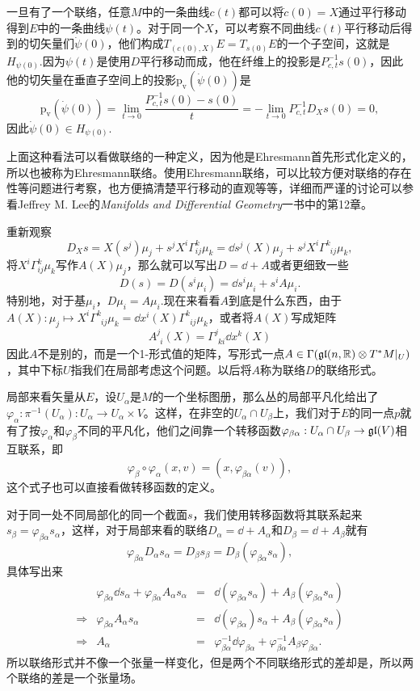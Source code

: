 一旦有了一个联络，任意$M$中的一条曲线$c(t)$都可以将$\dot{c}(0)=X$通过平行移动得到$E$中的一条曲线$\psi(t)$。对于同一个$X$，可以考察不同曲线$c(t)$平行移动后得到的切矢量们$\dot{\psi}(0)$，他们构成$T_{(c(0),X)}E=T_{s(0)}E$的一个子空间，这就是$H_{\psi(0)}$.因为$\psi(t)$是使用$D$平行移动而成，他在纤维上的投影是$P_{c,t}^{-1}s(0)$，因此他的切矢量在垂直子空间上的投影$\mathrm{p_v}(\dot{\psi}(0))$是
\[
	\mathrm{p_v}(\dot{\psi}(0))=\lim_{t\to 0}\frac{P_{c,t}^{-1}s(0)-s(0)}{t}
	=-\lim_{t\to 0}P_{c,t}^{-1}D_{X}s(0)=0,
\]
因此$\dot{\psi}(0)\in H_{\psi(0)}$.

上面这种看法可以看做联络的一种定义，因为他是Ehresmann首先形式化定义的，所以也被称为Ehresmann联络。使用Ehresmann联络，可以比较方便对联络的存在性等问题进行考察，也方便搞清楚平行移动的直观等等，详细而严谨的讨论可以参看Jeffrey M. Lee的\emph{Manifolds and Differential Geometry}一书中的第12章。

重新观察
\[
	D_Xs=X(s^j)\mu_j+s^jX^i\Gamma^{k}_{ij}\mu_k=\dd s^j(X)\mu_j+s^jX^i\Gamma^k_{\phantom{k}ij}\mu_k,
\]
将$X^i\Gamma^{k}_{ij}\mu_k$写作$A(X)\mu_j$，那么就可以写出$D=\dd +A$或者更细致一些
\[
	D(s)=D(s^i\mu_i)=\dd s^i \mu_i+s^i A\mu_i.
\]
特别地，对于基$\mu_i$，$D\mu_i=A\mu_i$.现在来看看$A$到底是什么东西，由于$A(X):\mu_j \mapsto X^i\Gamma^k_{\phantom{k}ij}\mu_k=\dd x^i(X)\Gamma^k_{\phantom{k}ij}\mu_k$，或者将$A(X)$写成矩阵
\[
	A_{\phantom{j}i}^{j}(X)=\Gamma^j_{\phantom{j}ki}\dd x^k(X)
\]
因此$A$不是别的，而是一个1-形式值的矩阵，写形式一点$A\in \Gamma(\mathfrak{gl}(n,\mathbb{R})\otimes T^*M|_U)$，其中下标$U$指我们在局部考虑这个问题。以后将$A$称为联络$D$的联络形式。

局部来看矢量从$E$，设$U_\alpha$是$M$的一个坐标图册，那么丛的局部平凡化给出了$\varphi_\alpha:\pi^{-1}(U_\alpha):U_\alpha\to U_\alpha\times V$。这样，在非空的$U_\alpha\cap U_\beta$上，我们对于$E$的同一点$p$就有了按$\varphi_\alpha$和$\varphi_\beta$不同的平凡化，他们之间靠一个转移函数$\varphi_{\beta\alpha}:U_\alpha\cap U_\beta\to \mathfrak{gl}(V)$相互联系，即
\[
	\varphi_\beta\circ \varphi_\alpha (x,v)=(x,\varphi_{\beta\alpha}(v)),
\]
这个式子也可以直接看做转移函数的定义。

对于同一处不同局部化的同一个截面$s$，我们使用转移函数将其联系起来$s_\beta=\varphi_{\beta\alpha}s_\alpha$，这样，对于局部来看的联络$D_\alpha=\dd+A_\alpha$和$D_\beta=\dd+A_\beta$就有
\[
	\varphi_{\beta\alpha}D_\alpha s_\alpha=D_\beta s_\beta=D_\beta (\varphi_{\beta\alpha}s_\alpha),
\]
具体写出来
\[
\begin{array}{llcl}
	&\varphi_{\beta\alpha}\dd s_\alpha+\varphi_{\beta\alpha}A_\alpha s_\alpha&=&\dd(\varphi_{\beta\alpha}s_\alpha)+A_\beta(\varphi_{\beta\alpha}s_\alpha)\\
	\Rightarrow &\varphi_{\beta\alpha}A_\alpha s_\alpha&=&\dd(\varphi_{\beta\alpha})s_\alpha+A_\beta(\varphi_{\beta\alpha}s_\alpha)\\
	\Rightarrow &A_\alpha &=&\varphi_{\beta\alpha}^{-1}\dd\varphi_{\beta\alpha}+\varphi_{\beta\alpha}^{-1}A_\beta \varphi_{\beta\alpha}.
\end{array}
\]
所以联络形式并不像一个张量一样变化，但是两个不同联络形式的差却是，所以两个联络的差是一个张量场。

